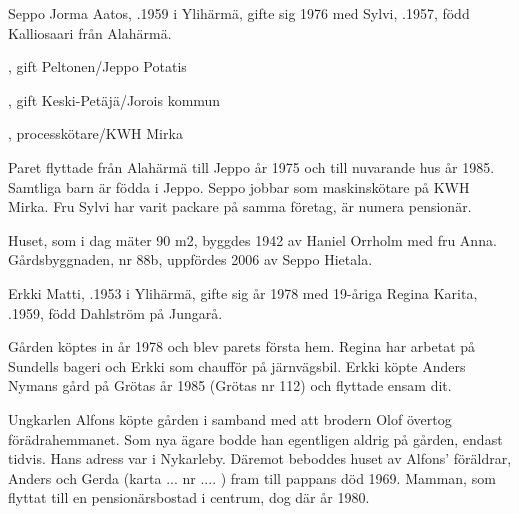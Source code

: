 
Seppo Jorma Aatos, .1959 i Ylihärmä, gifte sig 1976 med Sylvi, .1957,	född Kalliosaari från Alahärmä.
\begin{jhchildren}
  \item {}, gift Peltonen/Jeppo Potatis
  \item {}, gift Keski-Petäjä/Jorois kommun
  \item {}, processkötare/KWH Mirka
\end{jhchildren}


Paret flyttade från Alahärmä till Jeppo år 1975 och till nuvarande hus år 1985. Samtliga barn är födda i Jeppo. Seppo jobbar som maskinskötare på KWH Mirka. Fru Sylvi har varit packare på samma företag, är numera pensionär.

Huset, som i dag mäter 90 m2, byggdes 1942 av Haniel Orrholm med fru Anna. Gårdsbyggnaden, nr 88b, uppfördes 2006 av Seppo Hietala.


Erkki Matti, .1953 i Ylihärmä, gifte sig år 1978 med 19-åriga Regina Karita, .1959, född Dahlström på Jungarå.
\begin{jhchildren}
  \item {}
  \item {}
  \item {}
  \item {}
\end{jhchildren}
Gården köptes in år 1978 och blev parets första hem. Regina har arbetat på Sundells bageri och Erkki som chaufför på järnvägsbil. Erkki köpte Anders Nymans gård på Grötas år 1985 (Grötas nr 112) och flyttade ensam dit.


Ungkarlen Alfons köpte gården i samband med att brodern Olof övertog förädrahemmanet. Som nya ägare bodde han egentligen aldrig på gården, endast tidvis. Hans adress var i Nykarleby. Däremot beboddes huset av Alfons' föräldrar, Anders och Gerda (karta ... nr .... ) fram till pappans död 1969. Mamman, som flyttat till en pensionärsbostad i centrum, dog där år 1980.

